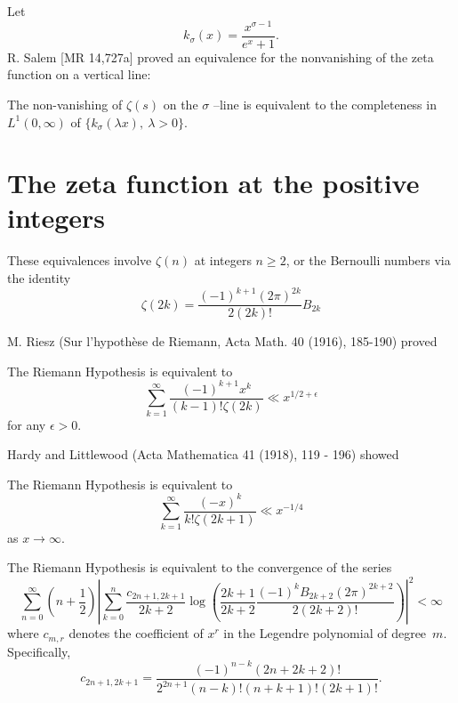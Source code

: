 \documentclass[12pt,letterpaper, reqno]{aimpl}
\begin{document}
\begin{problemblock}
Let
$$
k_\sigma(x) =\frac{x^{\sigma-1}}{e^x+1}.
$$
R. Salem [MR 14,727a] proved an equivalence for the nonvanishing
of the zeta function on a vertical line:
\begin{rhequivalence}[7.4] The non-vanishing of $\zeta(s)$ on the
$\sigma$ --line is equivalent to the completeness in
$L^1(0,\infty)$ of $\{k_\sigma(\lambda x),\ \lambda>0\}$.
\end{rhequivalence}
\end{problemblock}

\section{The zeta function at the positive integers}

These equivalences involve $\zeta(n)$ at integers $n\ge 2$,
or the Bernoulli numbers via the identity
$$
\zeta\left(2k\right)=\frac{\left(-1\right)^{k+1}\left(2\pi\right)^{2k}}{2%
\left(2k\right)!}B_{2k}
$$



\begin{problemblock}
M. Riesz (Sur l'hypoth\`{e}se de Riemann, Acta Math. 40 (1916), 185-190)
proved
\begin{rhequivalence}[8.1] The Riemann Hypothesis is equivalent to
$$
\sum_{k=1}^\infty \frac{(-1)^{k+1}x^k}{(k-1)!\zeta(2k)}\ll x^{1/2+\epsilon}
$$
for any $\epsilon>0$.
\end{rhequivalence}
\end{problemblock}

\begin{problemblock}
Hardy and Littlewood (Acta Mathematica 41 (1918), 119 - 196) showed

\begin{rhequivalence}[8.2] The Riemann Hypothesis is equivalent to
 $$\sum_{k=1}^\infty \frac{(-x)^k}{k!\zeta(2k+1)}\ll x^{-1/4}$$
as $x\to \infty$.
\end{rhequivalence}
\end{problemblock}

 \begin{problemblock}

\begin{rhequivalence}[8.3]  The Riemann Hypothesis is equivalent to the convergence of the series
$$
\sum_{n=0}^\infty\left(n+\frac{1}{2}\right)\left|\sum_{k=0}^n\frac{c_{2n+1,
2k+1}}{2k+2}\log\left(\frac{2k+1}{2k+2}\frac{\left(-1\right)^kB_{2k+2}\left(2
\pi\right)^{2k+2}}{2\left(2k+2\right)!}\right)\right|^2<\infty
$$
where $c_{m,r}$ denotes the coefficient of $x^r$ in the Legendre
polynomial of degree~$m$.
Specifically,
$$
c_{2n+1,2k+1}=\frac{\left(-1\right)^{n-k}\left(2n+2k+2\right)!}
{2^{2n+1} \left(n-k\right)!\left(n+k+1\right)!\left(2k+1\right)!}.
$$
\end{rhequivalence}

\end{problemblock}
\end{document}
